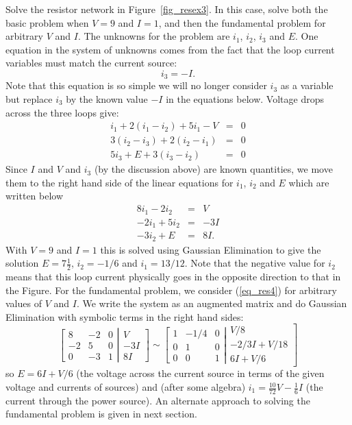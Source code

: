 \begin{example} 
\label{ex_resex3}
Solve the resistor network in Figure~\ref{fig_resex3}. In this case, solve 
both the basic problem when $V=9$ and $I=1$, and then the fundamental problem
for arbitrary $V$ and $I$. 
{\rm The unknowns for the problem are $i_1$, $i_2$, $i_3$ and $E$. One 
equation in the system of unknowns comes from the fact that the loop 
current variables must match the current source:
\[
i_3= -I.
\]
Note that this equation is so simple we will no longer consider $i_3$ 
as a variable but replace $i_3$ by the known value $-I$ in the 
equations below. 
Voltage drops across the three loops give:
\begin{eqnarray*}
i_1 + 2(i_1-i_2) + 5i_1 - V & = & 0 \\
3(i_2 - i_3) + 2(i_2 - i_1) & = & 0 \\
5 i_3 + E + 3(i_3-i_2) & = & 0 
\end{eqnarray*}
Since $I$ and $V$ and $i_3$ (by the discussion above) are known 
quantities, we move them to the right hand side of the linear 
equations for $i_1$, $i_2$ and $E$ which are written below 
\begin{eqnarray}
\nonumber
8i_1 - 2i_2 & = & V \\
\label{eq_res4}
-2i_1 + 5i_2 & = & -3I \\
\nonumber 
-3i_2 + E & = & 8I.
\end{eqnarray}
With $V=9$ and $I=1$ this is solved using Gaussian Elimination to give 
the solution $E=7 \frac{1}{2}$, $i_2 = -1/6$ and $i_1= 13/12$. Note that the 
negative value for $i_2$ means that this loop current physically goes in the 
opposite direction to that in the Figure. For the 
fundamental problem, we consider (\ref{eq_res4}) for arbitrary values 
of $V$ and $I$. We write the system as an augmented matrix and do 
Gaussian Elimination with symbolic terms in the right hand sides:
\[
\left[
\begin{array}{ccc}
8 & -2 & 0 \\
-2 & 5 & 0 \\
0 & -3 & 1 
\end{array}
\right|
\left.
\begin{array}{c}
V \\ -3I \\ 8I 
\end{array}
\right] 
\sim 
\left[
\begin{array}{ccc}
1 & -1/4 & 0 \\
0 & 1 & 0 \\
0 & 0 & 1 
\end{array}
\right|
\left.
\begin{array}{c}
V/8 \\ -2/3I +V/18 \\ 6I + V/6
\end{array}
\right] 
\]
so $E=6I + V/6$ (the voltage across the current source in terms of the 
given voltage and currents of sources) and (after some algebra) 
$i_1 = \frac{10}{72} V - \frac{1}{6} I$ (the current through the
power source). An alternate approach to solving the fundamental 
problem is given in next section.}
\end{example} 

